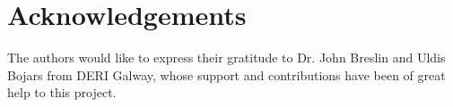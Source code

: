 \documentclass{llncs}
\begin{document}
\section*{Acknowledgements}

The authors would like to express their gratitude to Dr. John Breslin and
Uldis Bojars from DERI Galway, whose support and contributions have been of 
great help to this project.



%
\end{document}
